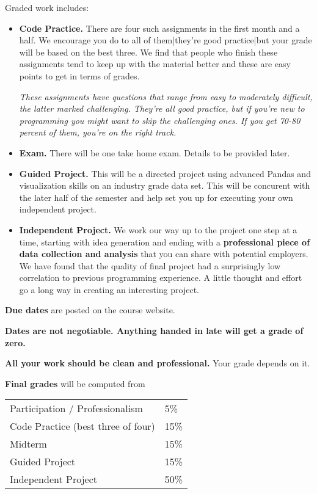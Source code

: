 Graded work includes:
\begin{itemize}

\item {\bf Code Practice.\/}
There are four such assignments in the first month and a half. We encourage you do to all of them|they're good practice|but your grade will be based on the best three. We find that people who finish these assignments tend to keep up with the material better and these are easy points to get in terms of grades.

{\it These assignments have questions that range from easy to moderately difficult,
the latter marked {\it challenging\/}.
They're all good practice, but if you're new to programming you
might want to skip the challenging ones.
If you get 70-80 percent of them, you're on the right track. \/}

\item {\bf Exam.\/}
There will be one take home exam. Details to be provided later.


\item {\bf Guided Project.\/}
This will be a directed project using advanced Pandas and visualization skills on an industry grade data set. This will be concurent with the later half of the semester and help set you up for executing your own independent project.

\item {\bf Independent Project.\/}
We work our way up to the project one step at a time, starting with idea generation and ending
with a {\bf professional piece of data collection and analysis\/}
that you can share with potential employers. We have found that the quality
of final project had a surprisingly low correlation to previous programming experience. A little thought and
effort go a long way in creating an interesting project.

\end{itemize}


{\bf Due dates} are posted on the course website.

{\bf Dates are not negotiable.
Anything handed in late will get a grade of zero.\/}

{\bf All your work should be clean and professional.}  Your grade depends on it.

{\bf Final grades\/} will be computed from
\begin{center}
\begin{tabular}{ll}
Participation / Professionalism & 5\% \\
Code Practice (best three of four) & 15\% \\
Midterm       & 15\% \\
Guided Project        & 15\% \\
Independent Project     & 50\% \\
\end{tabular}
\end{center}

